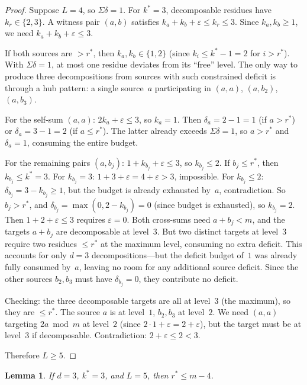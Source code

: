 \documentclass[11pt]{amsart}
\newtheorem{lemma}[theorem]{Lemma}
\theoremstyle{definition}
\theoremstyle{remark}
\begin{document}
\begin{proof}
Suppose $L = 4$, so $\Sigma\delta = 1$.
For $k^* = 3$, decomposable residues have $k_r \in \{2, 3\}$.
A witness pair $(a, b)$ satisfies $k_a + k_b + \varepsilon \le k_r \le 3$.
Since $k_a, k_b \ge 1$, we need $k_a + k_b + \varepsilon \le 3$.

If both sources are $> r^*$, then $k_a, k_b \in \{1, 2\}$ (since
$k_i \le k^* - 1 = 2$ for $i > r^*$).
With $\Sigma\delta = 1$, at most one residue deviates from its ``free''
level.  The only way to produce three decompositions from sources with
such constrained deficit is through a hub pattern: a single source~$a$
participating in $(a, a)$, $(a, b_2)$, $(a, b_3)$.

For the self-sum $(a, a)$: $2k_a + \varepsilon \le 3$, so $k_a = 1$.
Then $\delta_a = 2 - 1 = 1$ (if $a > r^*$) or $\delta_a = 3 - 1 = 2$ (if $a \le r^*$).
The latter already exceeds $\Sigma\delta = 1$, so $a > r^*$ and $\delta_a = 1$,
consuming the entire budget.

For the remaining pairs $(a, b_j)$: $1 + k_{b_j} + \varepsilon \le 3$,
so $k_{b_j} \le 2$.  If $b_j \le r^*$, then $k_{b_j} \le k^* = 3$.
For $k_{b_j} = 3$: $1 + 3 + \varepsilon = 4 + \varepsilon > 3$, impossible.
For $k_{b_j} \le 2$: $\delta_{b_j} = 3 - k_{b_j} \ge 1$, but the budget
is already exhausted by~$a$, contradiction.
So $b_j > r^*$, and $\delta_{b_j} = \max(0, 2 - k_{b_j}) = 0$
(since budget is exhausted), so $k_{b_j} = 2$.
Then $1 + 2 + \varepsilon \le 3$ requires $\varepsilon = 0$.
Both cross-sums need $a + b_j < m$, and the targets $a + b_j$ are
decomposable at level~$3$.  But two distinct targets at level~$3$
require two residues $\le r^*$ at the maximum level, consuming no extra
deficit.  This accounts for only $d = 3$ decompositions---but the deficit
budget of~$1$ was already fully consumed by~$a$, leaving no room for
any additional source deficit.  Since the other sources $b_2, b_3$ must
have $\delta_{b_j} = 0$, they contribute no deficit.

Checking: the three decomposable targets are all at level~$3$ (the maximum),
so they are $\le r^*$.  The source $a$ is at level~$1$, $b_2, b_3$ at
level~$2$.  We need $(a, a)$ targeting $2a \bmod m$ at level~$2$
(since $2 \cdot 1 + \varepsilon = 2 + \varepsilon$), but the target must be
at level~$3$ if decomposable.  Contradiction: $2 + \varepsilon \le 2 < 3$.

Therefore $L \ge 5$.
\end{proof}

\begin{lemma}\label{lem:C-k3-rstar}
If $d = 3$, $k^* = 3$, and $L = 5$, then $r^* \le m - 4$.
\end{lemma}
\end{document}

